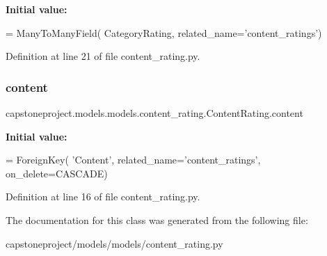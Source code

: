 {\bfseries Initial value\+:}
\begin{DoxyCode}
=  ManyToManyField(
        CategoryRating,
        related\_name=\textcolor{stringliteral}{'content\_ratings'})
\end{DoxyCode}


Definition at line 21 of file content\+\_\+rating.\+py.

\mbox{\label{classcapstoneproject_1_1models_1_1models_1_1content__rating_1_1_content_rating_a5240f3755ad71d33087cf98744b86394}} 
\subsubsection{\texorpdfstring{content}{content}}
{\footnotesize\ttfamily capstoneproject.\+models.\+models.\+content\+\_\+rating.\+Content\+Rating.\+content\hspace{0.3cm}{\ttfamily [static]}}

{\bfseries Initial value\+:}
\begin{DoxyCode}
=  ForeignKey(
        \textcolor{stringliteral}{'Content'},
        related\_name=\textcolor{stringliteral}{'content\_ratings'},
        on\_delete=CASCADE)
\end{DoxyCode}


Definition at line 16 of file content\+\_\+rating.\+py.



The documentation for this class was generated from the following file\+:\begin{DoxyCompactItemize}
\item 
capstoneproject/models/models/content\+\_\+rating.\+py\end{DoxyCompactItemize}
